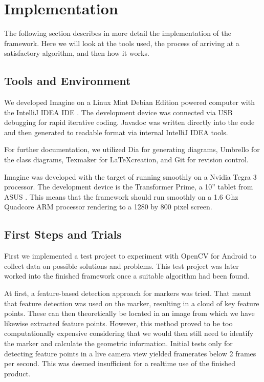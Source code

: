 \section{Implementation}

The following section describes in more detail the implementation of the framework.
Here we will look at the tools used, the process of arriving at a satisfactory algorithm, and then how it works.

\subsection{Tools and Environment}

We developed Imagine on a Linux Mint Debian Edition powered computer with the IntelliJ IDEA IDE \cite{idea}.
The development device was connected via USB debugging for rapid iterative coding.
Javadoc was written directly into the code and then generated to readable format via internal IntelliJ IDEA tools.

For further documentation, we utilized Dia \cite{dia} for generating diagrams, Umbrello \cite{umbrello} for the class diagrams, Texmaker \cite{texmaker} for \LaTeX  creation, and Git \cite{git} for revision control.

Imagine was developed with the target of running smoothly on a Nvidia Tegra 3 processor.
The development device is the Transformer Prime, a 10'' tablet from ASUS \cite{devicedev}.
This means that the framework should run smoothly on a 1.6 Ghz Quadcore ARM processor rendering to a 1280 by 800 pixel screen.

\subsection{First Steps and Trials}

First we implemented a test project to experiment with OpenCV for Android to collect data on possible solutions and problems.
This test project was later worked into the finished framework once a suitable algorithm had been found.

At first, a feature-based detection approach for markers was tried.
That meant that feature detection was used on the marker, resulting in a cloud of key feature points.
These can then theoretically be located in an image from which we have likewise extracted feature points.
However, this method proved to be too computationally expensive considering that we would then still need to identify the marker and calculate the geometric information.
Initial tests only for detecting feature points in a live camera view yielded framerates below 2 frames per second.
This was deemed insufficient for a realtime use of the finished product.

